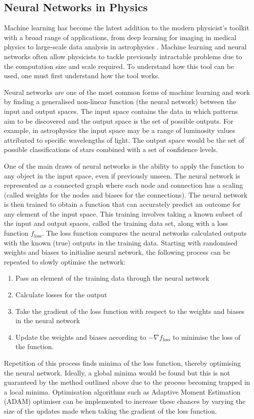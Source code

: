 \documentclass[10pt]{iopart}
\begin{document}
\subsection{Neural Networks in Physics}
Machine learning has become the latest addition to the modern physicist's toolkit with a broad range of applications, from deep learning for imaging in medical physics \cite{MedPhysDL} to large-scale data analysis in astrophysics \cite{astroML}. Machine learning and neural networks  often allow physicists to tackle previously intractable problems due to the computation size and scale required. To understand how this tool can be used, one must first understand how the tool works.

Neural networks are one of the most common forms of machine learning and work by finding a generalised non-linear function (the neural network) between the input and output spaces. The input space contains the data in which patterns aim to be discovered and the output space is the set of possible outputs. For example, in astrophysics the input space may be a range of luminosity values attributed to specific wavelengths of light. The output space would be the set of possible classifications of stars combined with a set of confidence levels.

 One of the main draws of neural networks is the ability to apply the function to any object in the input space, even if previously unseen. The neural network is represented as a connected graph where each node and connection has a scaling (called weights for the nodes and biases for the connections). The neural network is then trained to obtain a function that can accurately predict an outcome for any element of the input space. This training involves taking a known subset of the input and output spaces, called the training data set, along with a loss function $f_{\mathrm{loss}}$. The loss function compares the neural networks calculated outputs with the known (true) outputs in the training data. Starting with randomised weights and biases to initialise neural network, the following process can be repeated to slowly optimise the network:
 \begin{enumerate}
 	\item Pass an element of the training data through the neural network
 	\item Calculate losses for the output
 	\item Take the gradient of the loss function with respect to the weights and biases in the neural network
 	\item Update the weights and biases according to $-\nabla f_{\mathrm{loss}}$ to minimise the loss of the function.
 \end{enumerate}
 Repetition of this process finds minima of the loss function, thereby optimising the neural network. 
Ideally, a global minima would be found but this is not guaranteed by the method outlined above due to the process becoming trapped in a local minima.  Optimisation algorithms such as Adaptive Moment Estimation (ADAM) optimiser \cite{ADAM} can be implemented to increase these chances by varying the size of the updates made when taking the gradient of the loss function.
\end{document}
